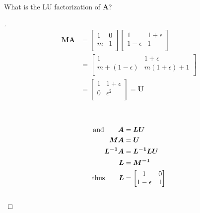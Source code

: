 \documentclass[12pt]{article}
\newenvironment{exercise}[2][Exercise]{\begin{trivlist}
\item[\hskip \labelsep {\bfseries #1}\hskip \labelsep {\bfseries #2.}]}{\end{trivlist}}
\begin{document}
\begin{exercise}{3} 
	What is the LU factorization of $\bm{A}$?
\end{exercise}

\begin{proof}[]
	\begin{align*}
		\bm{MA} &= 
			\begin{bmatrix}
				1 & 0 \\
				m & 1 \\
			\end{bmatrix}
			\begin{bmatrix}
				1 & 1 + \epsilon \\
				1 - \epsilon & 1 \\
			\end{bmatrix} \\
		&= \begin{bmatrix}
				1 & 1 + \epsilon \\
				m + (1 - \epsilon) & m(1 + \epsilon) + 1 \\
			\end{bmatrix} \\
		&= \begin{bmatrix}
			1 & 1+\epsilon \\
			0 & \epsilon^2 \\
		\end{bmatrix} = \bm{U}
	\end{align*} \\
	\\
	\begin{align*}
		\textnormal{and} \qquad \bm{A} &= \bm{LU} \\
		\bm{MA} &= \bm{U} \\
		\bm{L^{-1}A} &= \bm{L^{-1}LU} \\
		\bm{L} &= \bm{M^{-1}} \\
		\textnormal{thus} \qquad \bm{L} &= 
			\begin{bmatrix}
				1 & 0 \\
				1-\epsilon & 1 \\ 
			\end{bmatrix} \\
	\end{align*} \\
\end{proof}
\end{document}
